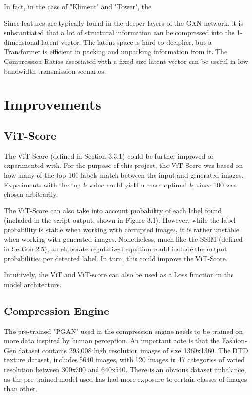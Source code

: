 In fact, in the case of "Kliment" and "Tower", the 


Since features are typically found in the deeper layers of the GAN network, it is substantiated that a lot of structural 
information can be compressed into the 1-dimensional latent vector.
The latent space is hard to decipher, but a Transformer is efficient in packing and unpacking information from it.
The Compression Ratios associated with a fixed size latent vector can be useful in low bandwidth transmission scenarios.

\section{Improvements}

\subsection{ViT-Score}

The ViT-Score (defined in Section 3.3.1) could be further improved or experimented with.
For the purpose of this project, the ViT-Score was based on how many of the top-100 labels match
between the input and generated images. Experiments with the top-$k$ value could yield a more
optimal $k$, since 100 was chosen arbitrarily.

The ViT-Score can also take into account probability of each label found (included in the script output, shown in Figure 3.1).
However, while the label probability is stable when working with corrupted images, it is rather 
unstable when working with generated images. Nonetheless, much like the SSIM (defined in Section 2.5),
an elaborate regularized equation could include the output probabilities per detected label.
In turn, this could improve the ViT-Score. 

Intuitively, the ViT and ViT-score can also be used as a Loss function in the model architecture.


\subsection{Compression Engine}

The pre-trained "PGAN" used in the compression engine needs to be trained on more data inspired by human perception.
An important note is that the Fashion-Gen dataset contains 293,008 high resolution images of size 1360x1360. 
The DTD texture dataset, includes 5640 images, with 120 images in 47 categories of varied resolution between 300x300 and 640x640. 
There is an obvious dataset imbalance, as the pre-trained model used has had more exposure to certain classes of images than other. 
\citep{PytorchGANZoo}


